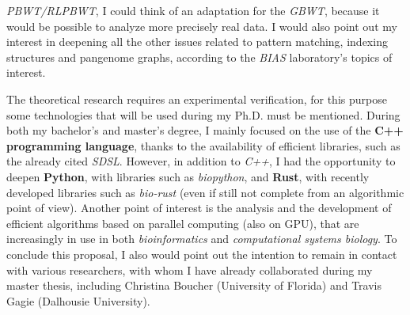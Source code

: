 \documentclass[a4paper,11pt, oneside]{article}
\newcommand{\pb}[1]{\todo[backgroundcolor=red]{\textbf{PB} #1}}
\newcommand{\dc}[1]{\todo[[backgroundcolor=yellow]{\textbf{DC} #1}}
\begin{document}
\begin{enumerate}[leftmargin=.2in]
  \textit{PBWT/RLPBWT}, I could think of an adaptation 
  for the \textit{GBWT}, because it would be possible to
  analyze more precisely real data. I would also point out my interest in
  deepening all the other issues related to 
  pattern matching, indexing structures and pangenome graphs, according to the
  \textit{BIAS} laboratory's topics of interest.
\end{enumerate}
\vspace{-1.25mm}
The theoretical research requires an experimental verification, for this purpose
some technologies that will be used during my Ph.D. must be mentioned. 
During both my bachelor's and master's degree, I mainly focused on the use of
the \textbf{C++ programming language}, thanks to the
availability of efficient libraries, such as the already 
cited \textit{SDSL}. However, in
addition to \textit{C++}, I had the opportunity to deepen 
\textbf{Python}, with libraries such as \textit{biopython}, and \textbf{Rust},
with recently developed libraries such as \textit{bio-rust} (even if still not
complete from an algorithmic point of view). Another point of interest is the
analysis and the development of efficient algorithms based on parallel computing
(also on GPU), that are increasingly in use in both \textit{bioinformatics} and
\textit{computational systems biology}.  
To conclude this proposal, I also would point out the intention to remain in
contact with various researchers, with whom I have already collaborated during 
my master thesis, including Christina Boucher (University of Florida)
and Travis Gagie (Dalhousie University).
\end{document}
